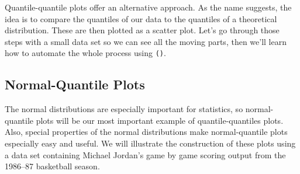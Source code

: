 \documentclass[twoside]{book}\usepackage[]{graphicx}\usepackage[]{xcolor}
\newcommand{\Rindex}[1]{\index{\texttt{#1}}}
\newcommand{\function}[1]{{\color{purple!75!blue}\texttt{\StrSubstitute{#1}{()}{}()}}\Rindex{#1}}
\newcounter{example}[section]
\begin{document}
Quantile-quantile plots offer an alternative approach.  As the name suggests, the idea is 
to compare the quantiles of our data to the quantiles of a theoretical distribution.  These
are then plotted as a scatter plot.  Let's go through those steps with a small data
set so we can see all the moving parts, then we'll learn how to automate the whole
process using \function{gf_qq()}.

\subsection{Normal-Quantile Plots}
The normal distributions are especially important for statistics, so normal-quantile
plots will be our most important example of quantile-quantiles plots.  Also, special
properties of the normal distributions make normal-quantile plots especially easy
and useful.  We will illustrate the construction of these plots using a data set
containing Michael Jordan's game by game scoring output from the 1986--87 basketball
season.
\end{document}
